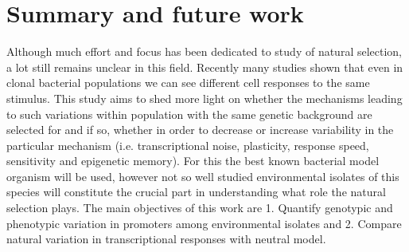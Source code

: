 \chapter*{Summary and future work}

\shorthandoff{-}
Although much effort and focus has been dedicated to study of natural selection, a lot still remains unclear in this field.
Recently many studies shown that even in clonal bacterial populations we can see different cell responses to the same stimulus.
This study aims to shed more light on whether the mechanisms leading to such variations within population with the same genetic background are selected for and if so, whether in order to decrease or increase variability in the particular mechanism (i.e. transcriptional noise, plasticity, response speed, sensitivity and epigenetic memory).
For this the best known bacterial model organism  will be used, however not so well studied environmental isolates of this species will constitute the crucial part in understanding what role the natural selection plays.
The main objectives of this work are 1. Quantify genotypic and phenotypic variation in promoters among environmental  isolates and 2. Compare natural variation in transcriptional responses with neutral model.

